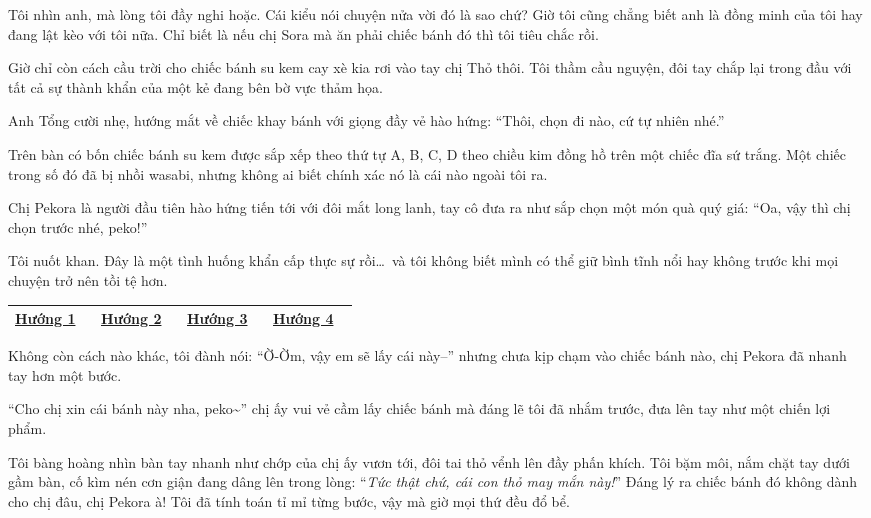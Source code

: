 \documentclass[../main.tex]{subfiles}
\begin{document}
Tôi nhìn anh, mà lòng tôi đầy nghi hoặc. Cái kiểu nói chuyện nửa vời đó là sao chứ? Giờ tôi cũng chẳng biết anh là đồng minh của tôi hay đang lật kèo với tôi nữa. Chỉ biết là nếu chị Sora mà ăn phải chiếc bánh đó thì tôi tiêu chắc rồi.

Giờ chỉ còn cách cầu trời cho chiếc bánh su kem cay xè kia rơi vào tay chị Thỏ thôi. Tôi thầm cầu nguyện, đôi tay chắp lại trong đầu với tất cả sự thành khẩn của một kẻ đang bên bờ vực thảm họa.

Anh Tổng cười nhẹ, hướng mắt về chiếc khay bánh với giọng đầy vẻ hào hứng: ``Thôi, chọn đi nào, cứ tự nhiên nhé.''

Trên bàn có bốn chiếc bánh su kem được sắp xếp theo thứ tự A, B, C, D theo chiều kim đồng hồ trên một chiếc đĩa sứ trắng. Một chiếc trong số đó đã bị nhồi wasabi, nhưng không ai biết chính xác nó là cái nào ngoài tôi ra.

Chị Pekora là người đầu tiên hào hứng tiến tới với đôi mắt long lanh, tay cô đưa ra như sắp chọn một món quà quý giá: ``Oa, vậy thì chị chọn trước nhé, peko!''

Tôi nuốt khan. Đây là một tình huống khẩn cấp thực sự rồi\dots\ và tôi không biết mình có thể giữ bình tĩnh nổi hay không trước khi mọi chuyện trở nên tồi tệ hơn.

\begin{table}[H]
  \centering
  \begin{tabular}{|>{\centering\arraybackslash}p{0.1\linewidth}|>{\centering\arraybackslash}p{0.1\linewidth}|>{\centering\arraybackslash}p{0.1\linewidth}|>{\centering\arraybackslash}p{0.1\linewidth}|} \hline
    \hyperref[cakeA]{Hướng 1} & \hyperref[cakeB]{Hướng 2} &
    \hyperref[cakeC]{Hướng 3} & \hyperref[cakeD]{Hướng 4}   \\ \hline
  \end{tabular}
  \label{choice}
\end{table}

\newpage
\label{cakeA}

Không còn cách nào khác, tôi đành nói: ``Ờ-Ờm, vậy em sẽ lấy cái này--'' nhưng chưa kịp chạm vào chiếc bánh nào, chị Pekora đã nhanh tay hơn một bước.

``Cho chị xin cái bánh này nha, peko\~{}'' chị ấy vui vẻ cầm lấy chiếc bánh mà đáng lẽ tôi đã nhắm trước, đưa lên tay như một chiến lợi phẩm.

Tôi bàng hoàng nhìn bàn tay nhanh như chớp của chị ấy vươn tới, đôi tai thỏ vểnh lên đầy phấn khích. Tôi bặm môi, nắm chặt tay dưới gầm bàn, cố kìm nén cơn giận đang dâng lên trong lòng: ``\textit{Tức thật chứ, cái con thỏ may mắn này!}'' Đáng lý ra chiếc bánh đó không dành cho chị đâu, chị Pekora à! Tôi đã tính toán tỉ mỉ từng bước, vậy mà giờ mọi thứ đều đổ bể.
\end{document}
